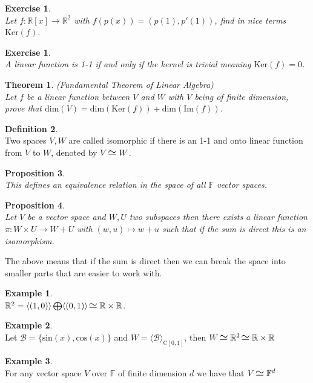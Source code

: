 \documentclass[12pt]{article}
\newcommand{\iso}{\scaleobj{1.3}{\hspace{1pt}{\simeq} \hspace{2pt}}}
\newtheorem{theorem}{Theorem}[section]
\newtheorem{prop}[theorem]{Proposition}
\theoremstyle{definition}
\newtheorem{definition}[theorem]{Definition}
\newtheorem*{example}{Example}
\theoremstyle{remark}
\theoremstyle{plain}
\newtheorem{ex}[subsubsection]{Exercise}
\begin{document}
\begin{ex}\leavevmode \\
    Let $f:\mathbb{R}[x]\to \mathbb{R}^2$ with $f(p(x))=(p(1),p'(1))$, find in nice terms $\mathrm{Ker}(f)$.
\end{ex}
\begin{ex}\leavevmode \\
    A linear function is 1-1 if and only if the kernel is trivial meaning $\mathrm{Ker}(f)=0$.
\end{ex}
\begin{theorem}\textup{(Fundamental Theorem of Linear Algebra)}\leavevmode \\
    Let $f$ be a linear function between $V$ and $W$ with $V$ being of finite dimension, prove that $\mathrm{dim}(V)=\mathrm{dim}(\mathrm{Ker}(f))+\mathrm{dim}(\mathrm{Im}(f))$.
\end{theorem}
\begin{definition}\leavevmode \\
    Two spaces $V,W$ are called isomorphic if there is an 1-1 and onto linear function from $V$ to $W$, denoted by $V\iso W$.
\end{definition}
\begin{prop}\leavevmode \\
    This defines an equivalence relation in the space of all $\mathbb{F}$ vector spaces.
\end{prop}
\begin{prop}\leavevmode \\
    Let $V$ be a vector space and $W,U$ two subspaces then there exists a linear function $\pi :W\times U\to W+U$ with $(w,u)\mapsto w+u$ such that if the sum is direct this is an isomorphism.
\end{prop}
The above means that if the sum is direct then we can break the space into smaller parts that are easier to work with.
\begin{example}\leavevmode \\
    $\mathbb{R}^2=\langle (1,0)\rangle \bigoplus\langle (0,1)\rangle\iso \mathbb{R} \times \mathbb{R}$.
\end{example}
\begin{example}\leavevmode \\
    Let $\mathcal{B}=\{ \mathrm{sin}(x),\mathrm{cos}(x)\}$ and $W=\langle \mathcal{B}\rangle_{\mathrm{C}[0,1]}$, then $W\iso \mathbb{R}^2\iso \mathbb{R}\times\mathbb{R}$
\end{example}
\begin{example}\leavevmode \\
    For any vector space $V$ over $\mathbb{F}$ of finite dimension $d$ we have that $V \iso \mathbb{F}^d$
\end{example}
\newpage
\end{document}
